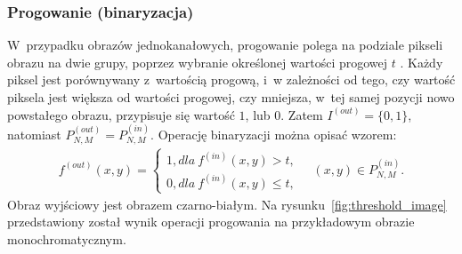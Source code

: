 \subsubsection{Progowanie (binaryzacja)} \label{sssec:threshold}
 W~przypadku obrazów jednokanałowych, progowanie polega na podziale pikseli obrazu na dwie grupy, poprzez wybranie określonej wartości progowej $t$ \cite{phillips94}. Każdy piksel jest porównywany z~wartością progową, i~w zależności od tego, czy wartość piksela jest większa od wartości progowej, czy mniejsza, w~tej samej pozycji nowo powstałego obrazu, przypisuje się wartość $1$, lub $0$. Zatem $I^{(out)} = \{0, 1\}$, natomiast $P^{(out)}_{N, M} = P^{(in)}_{N, M}$. Operację binaryzacji można opisać wzorem:
\begin{gather*}
  f^{(out)}(x, y) = \left\{\begin{matrix}
  1, dla \: f^{(in)}(x, y) > t,\\
  0, dla \: f^{(in)}(x, y) \leq t,
  \end{matrix}\right. \quad (x, y) \in P^{(in)}_{N,M}.
\end{gather*}
Obraz wyjściowy jest obrazem czarno-białym.
Na rysunku~\ref{fig:threshold_image} przedstawiony został wynik operacji progowania na przykładowym obrazie monochromatycznym.
